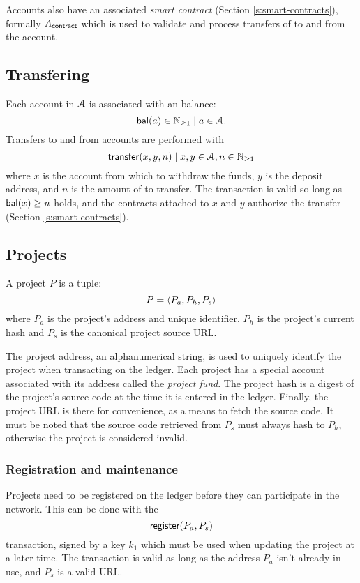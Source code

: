 Accounts also have an associated \emph{smart contract} (Section
\ref{s:smart-contracts}), formally $A_{\mathsf{contract}}$ which is used to
validate and process transfers of \oscoin{} to and from the account.

\subsection{Transfering \oscoin{}}
\label{s:transfering}

Each account in $\mathcal{A}$ is associated with an \oscoin{} balance:
\[
    \mathsf{bal}(a) \in \mathbb{N}_{\geq 1} \mid a \in \mathcal{A}.
\]
Transfers to and from accounts are performed with
\[
    \mathsf{transfer}\lparen x,y,n\rparen \mid x,y \in \mathcal{A}, n \in \mathbb{N}_{\geq 1}
\]
where $x$ is the account from which to withdraw the funds, $y$ is the deposit
address, and $n$ is the amount of \oscoin{} to transfer.  The transaction is
valid so long as $\mathsf{bal}(x) \geq n$ holds, and the contracts attached to $x$ and
$y$ authorize the transfer (Section \ref{s:smart-contracts}).

\subsection{Projects}
\label{s:projects}


A project $P$ is a tuple:
\[
    P = \langle P_a, P_h, P_s\rangle
\]
where $P_{a}$ is the project's address and unique identifier, $P_h$ is
the project's current hash and $P_s$ is the canonical project source
URL.

The project address, an alphanumerical string, is used to uniquely identify the
project when transacting on the ledger. Each project has a special account
associated with its address called the \emph{project fund}. The project hash is
a digest of the project's source code at the time it is entered in the ledger.
Finally, the project URL is there for convenience, as a means to fetch the
source code.  It must be noted that the source code retrieved from $P_s$ must
always hash to $P_h$, otherwise the project is considered invalid.

\subsubsection{Registration and maintenance} Projects need to be
registered on the ledger before they can participate in the
network. This can be done with the
\[
    \mathsf{register}\lparen P_a, P_s\rparen
\]
transaction, signed by a key $k_1$ which must be used when updating the project
at a later time. The transaction is valid as long as the address $P_a$ isn't
already in use, and $P_s$ is a valid URL.

